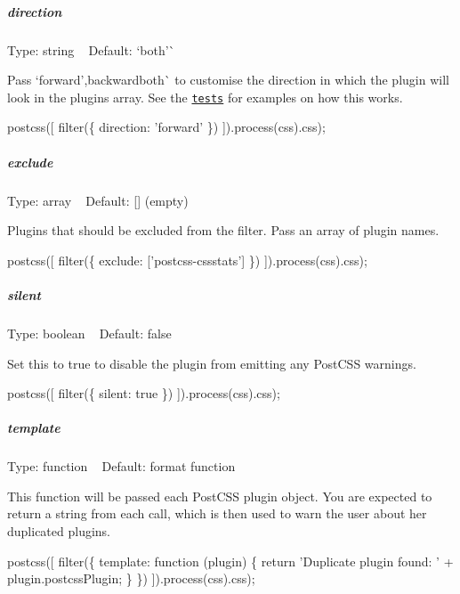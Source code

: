 \subparagraph*{direction}

Type\+: {\ttfamily string} ~\newline
Default\+: `\textquotesingle{}both'\`{}

Pass `\textquotesingle{}forward'{\ttfamily ,}\textquotesingle{}backward\textquotesingle{}both\textquotesingle{}\`{} to customise the direction in which the plugin will look in the plugins array. See the \href{src/__tests__}{\tt tests} for examples on how this works.


\begin{DoxyCode}
postcss([ filter(\{
    direction: 'forward'
\}) ]).process(css).css);
\end{DoxyCode}


\subparagraph*{exclude}

Type\+: {\ttfamily array} ~\newline
Default\+: {\ttfamily \mbox{[}\mbox{]} (empty)}

Plugins that should be excluded from the filter. Pass an array of plugin names.


\begin{DoxyCode}
postcss([ filter(\{
    exclude: ['postcss-cssstats']
\}) ]).process(css).css);
\end{DoxyCode}


\subparagraph*{silent}

Type\+: {\ttfamily boolean} ~\newline
Default\+: {\ttfamily false}

Set this to true to disable the plugin from emitting any Post\+C\+SS warnings.


\begin{DoxyCode}
postcss([ filter(\{
    silent: true
\}) ]).process(css).css);
\end{DoxyCode}


\subparagraph*{template}

Type\+: {\ttfamily function} ~\newline
Default\+: {\ttfamily format function}

This function will be passed each Post\+C\+SS plugin object. You are expected to return a string from each call, which is then used to warn the user about her duplicated plugins.


\begin{DoxyCode}
postcss([ filter(\{
    template: function (plugin) \{
        return 'Duplicate plugin found: ' + plugin.postcssPlugin;
    \}
\}) ]).process(css).css);
\end{DoxyCode}


